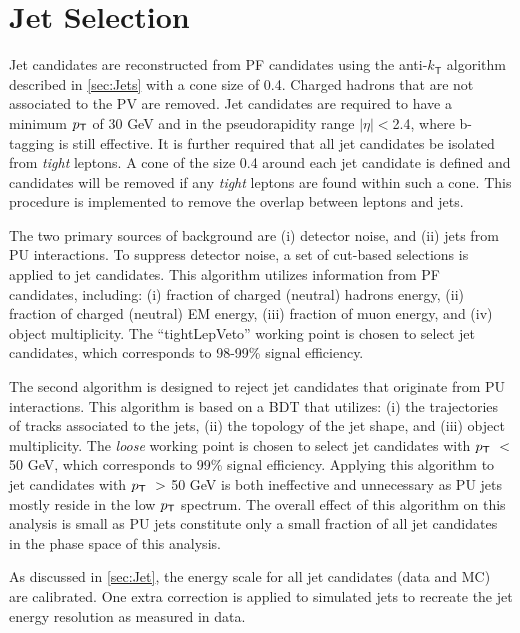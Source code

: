 \section{Jet Selection}
\label{sec:Jets}

Jet candidates are reconstructed from \ac{PF} candidates using the anti-$k_{\textsf{T}}$ algorithm described in \autoref{sec:Jets} with a cone size of 0.4. Charged hadrons that are not associated to the \ac{PV} are removed. Jet candidates are required to have a minimum $p_{\textsf{T}}$ of 30 GeV and in the pseudorapidity range $|\eta|<$2.4, where b-tagging is still effective. It is further required that all jet candidates be isolated from \emph{tight} leptons. A cone of the size 0.4 around each jet candidate is defined and candidates will be removed if any \emph{tight} leptons are found within such a cone. This procedure is implemented to remove the overlap between leptons and jets. 

The two primary sources of background are (i) detector noise, and (ii) jets from \ac{PU} interactions. To suppress detector noise, a set of cut-based selections is applied to jet candidates. This algorithm utilizes information from \ac{PF} candidates, including: (i) fraction of charged (neutral) hadrons energy, (ii) fraction of charged (neutral) EM energy, (iii) fraction of muon energy, and (iv) object multiplicity. The ``tightLepVeto'' working point is chosen to select jet candidates, which corresponds to 98-99\% signal efficiency.

The second algorithm is designed to reject jet candidates that originate from \ac{PU} interactions. This algorithm is based on a \ac{BDT} that utilizes: (i) the trajectories of tracks associated to the jets, (ii) the topology of the jet shape, and (iii) object multiplicity. The \emph{loose} working point is chosen to select jet candidates with $p_{\textsf{T}}~<$ 50 GeV, which corresponds to 99\% signal efficiency. Applying this algorithm to jet candidates with $p_{\textsf{T}}~>$ 50 GeV is both ineffective and unnecessary as \ac{PU} jets mostly reside in the low $p_{\textsf{T}}$ spectrum. The overall effect of this algorithm on this analysis is small as \ac{PU} jets constitute only a small fraction of all jet candidates in the phase space of this analysis. 

As discussed in \autoref{sec:Jet}, the energy scale for all jet candidates (data and \ac{MC}) are calibrated. One extra correction is applied to simulated jets to recreate the jet energy resolution as measured in data. 

